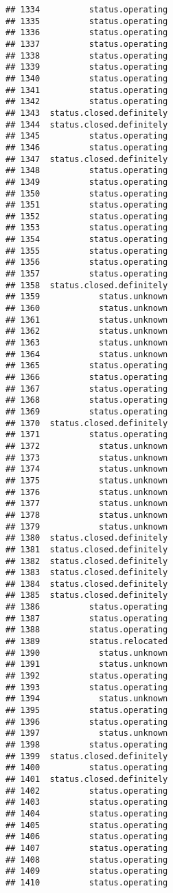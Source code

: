 \documentclass[
]{article}
\begin{document}
\begin{verbatim}
## 1334          status.operating
## 1335          status.operating
## 1336          status.operating
## 1337          status.operating
## 1338          status.operating
## 1339          status.operating
## 1340          status.operating
## 1341          status.operating
## 1342          status.operating
## 1343  status.closed.definitely
## 1344  status.closed.definitely
## 1345          status.operating
## 1346          status.operating
## 1347  status.closed.definitely
## 1348          status.operating
## 1349          status.operating
## 1350          status.operating
## 1351          status.operating
## 1352          status.operating
## 1353          status.operating
## 1354          status.operating
## 1355          status.operating
## 1356          status.operating
## 1357          status.operating
## 1358  status.closed.definitely
## 1359            status.unknown
## 1360            status.unknown
## 1361            status.unknown
## 1362            status.unknown
## 1363            status.unknown
## 1364            status.unknown
## 1365          status.operating
## 1366          status.operating
## 1367          status.operating
## 1368          status.operating
## 1369          status.operating
## 1370  status.closed.definitely
## 1371          status.operating
## 1372            status.unknown
## 1373            status.unknown
## 1374            status.unknown
## 1375            status.unknown
## 1376            status.unknown
## 1377            status.unknown
## 1378            status.unknown
## 1379            status.unknown
## 1380  status.closed.definitely
## 1381  status.closed.definitely
## 1382  status.closed.definitely
## 1383  status.closed.definitely
## 1384  status.closed.definitely
## 1385  status.closed.definitely
## 1386          status.operating
## 1387          status.operating
## 1388          status.operating
## 1389          status.relocated
## 1390            status.unknown
## 1391            status.unknown
## 1392          status.operating
## 1393          status.operating
## 1394            status.unknown
## 1395          status.operating
## 1396          status.operating
## 1397            status.unknown
## 1398          status.operating
## 1399  status.closed.definitely
## 1400          status.operating
## 1401  status.closed.definitely
## 1402          status.operating
## 1403          status.operating
## 1404          status.operating
## 1405          status.operating
## 1406          status.operating
## 1407          status.operating
## 1408          status.operating
## 1409          status.operating
## 1410          status.operating

\end{verbatim}
\end{document}
